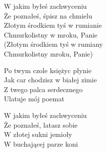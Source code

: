 
\begin{text}
    W jakim byłeś zachwyceniu\\
    Że poznałeś, śpisz na chmielu\\
    Złotym środkiem tyś w rumianie\\
    Chmurkolistny w mroku, Panie\\
    (Złotym środkiem tyś w rumiany\\
    Chmurkolistny mroku, Panie)

    Po twym czole księżyc płynie\\
    Jak car chodzisz w białej zimie\\
    Z twego palca serdecznego\\
    Ulatuje mój poemat

    W jakim byłeś zachwyceniu\\
    Że poznałeś, latasz sobie\\
    W złotej sukni jemioły\\
    W buchającej parze koni
\end{text}
\begin{chord}

\end{chord}